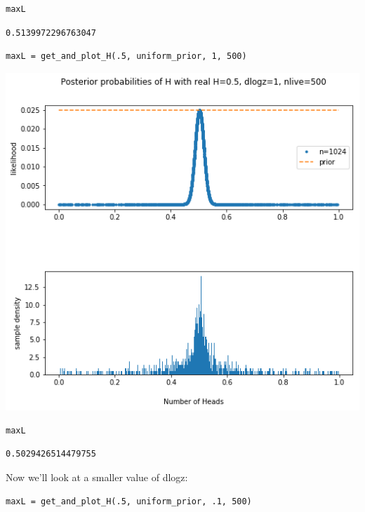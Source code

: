 \documentclass[11pt]{article}
\begin{document}
\begin{itemize}
\begin{verbatim}
maxL
\end{verbatim}

\begin{verbatim}
0.5139972296763047
\end{verbatim}

\begin{verbatim}
maxL = get_and_plot_H(.5, uniform_prior, 1, 500)
\end{verbatim}

\includegraphics[width=.9\linewidth]{./obipy-resources/692saO.png}

\begin{verbatim}
maxL
\end{verbatim}

\begin{verbatim}
0.5029426514479755
\end{verbatim}

Now we'll look at a smaller value of dlogz:

\begin{verbatim}
maxL = get_and_plot_H(.5, uniform_prior, .1, 500)
\end{verbatim}


\end{itemize}
\end{document}
